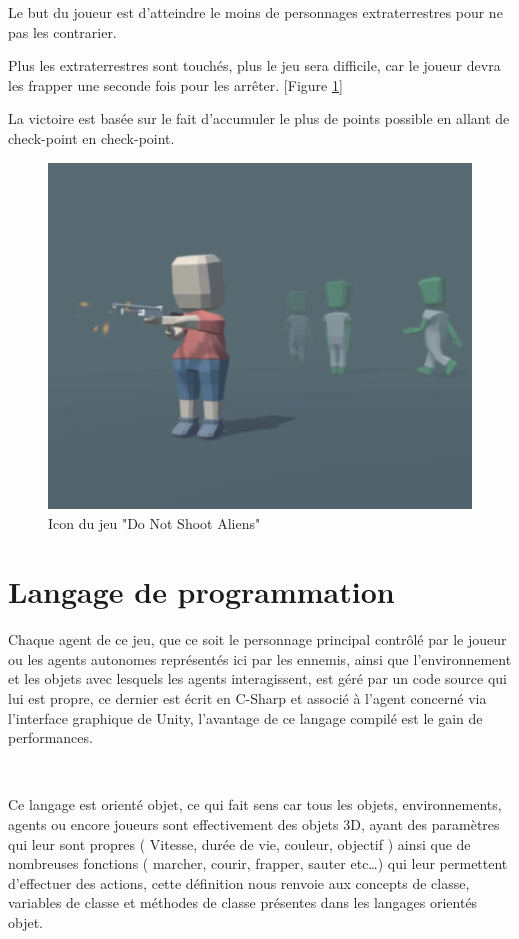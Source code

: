 Le but du joueur est d’atteindre le moins de personnages extraterrestres pour ne pas les contrarier.

Plus les extraterrestres sont touchés, plus le jeu sera difficile, car le joueur devra les frapper une seconde fois pour les arrêter. [Figure \ref{fig:7.2}] 

La victoire est basée sur le fait d’accumuler le plus de points possible en allant de check-point en check-point.

\begin{figure}[th]
\centering
\includegraphics{Figures/72unity.JPG}
\decoRule
\caption[Icon du jeu "Do Not Shoot Aliens"]{Icon du jeu "Do Not Shoot Aliens"}
\label{fig:7.2}
\end{figure}

\section{Langage de programmation}

Chaque agent de ce jeu, que ce soit le personnage principal contrôlé par le joueur ou les agents autonomes représentés ici par les ennemis, ainsi que l’environnement et les objets avec lesquels les agents interagissent, est géré par un code source qui lui est propre, ce dernier est écrit en C-Sharp et associé à l'agent concerné via l'interface graphique de Unity, l'avantage de ce langage compilé est le gain de performances.

~\par
Ce langage est orienté objet, ce qui fait sens car tous les objets, environnements, agents ou encore joueurs sont effectivement des objets 3D, ayant des paramètres qui leur sont propres ( Vitesse, durée de vie, couleur, objectif ) ainsi que de nombreuses fonctions ( marcher, courir, frapper, sauter etc…) qui leur permettent d’effectuer des actions, cette définition nous renvoie aux concepts de classe, variables de classe et méthodes de classe présentes dans les langages orientés objet.



